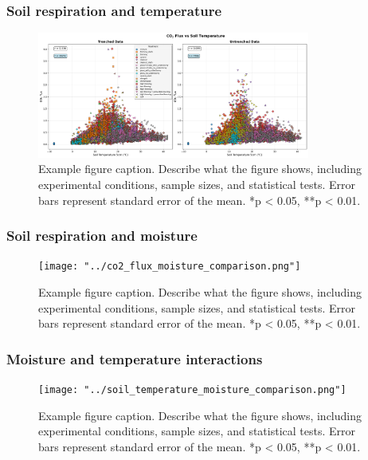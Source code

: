 \documentclass[12pt,a4paper]{article}
\begin{document}
\subsubsection{Soil respiration and temperature}
\begin{figure}[H]
    \centering
    \includegraphics[width=0.8\textwidth]{"../co2_flux_temperature_comparison.png"}
    \caption{Example figure caption. Describe what the figure shows, including experimental conditions, sample sizes, and statistical tests. Error bars represent standard error of the mean. *p < 0.05, **p < 0.01.}
    \label{fig:co2_temp}
\end{figure}

\subsubsection{Soil respiration and moisture}
\begin{figure}[H]
    \centering
    \texttt{[image: "../co2\_flux\_moisture\_comparison.png"]}
    \caption{Example figure caption. Describe what the figure shows, including experimental conditions, sample sizes, and statistical tests. Error bars represent standard error of the mean. *p < 0.05, **p < 0.01.}
    \label{fig:co2_moisture}
\end{figure}

\subsubsection{Moisture and temperature interactions}
\begin{figure}[H]
    \centering
    \texttt{[image: "../soil\_temperature\_moisture\_comparison.png"]}
    \caption{Example figure caption. Describe what the figure shows, including experimental conditions, sample sizes, and statistical tests. Error bars represent standard error of the mean. *p < 0.05, **p < 0.01.}
    \label{fig:temp_moisture}
\end{figure}
\end{document}
